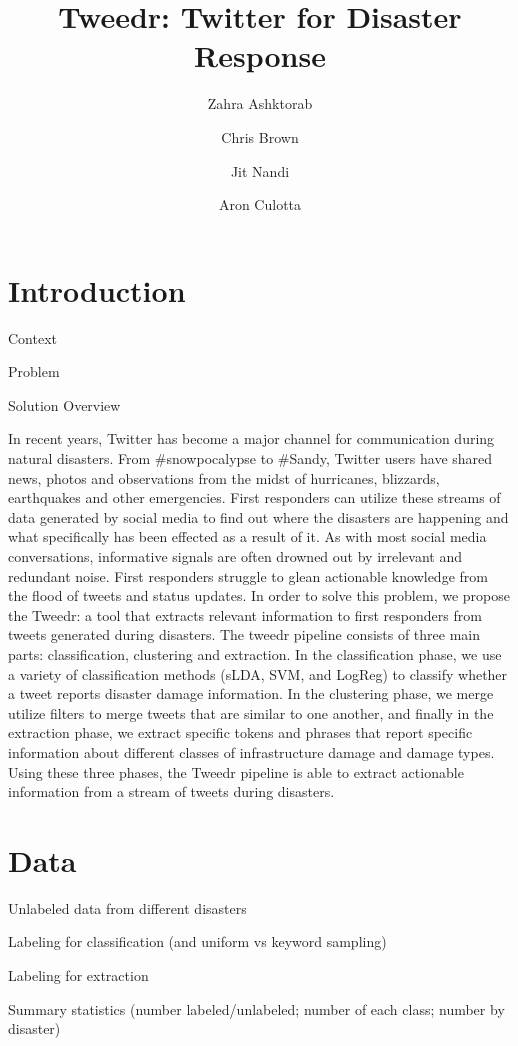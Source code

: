 \documentclass{article}
\title{Tweedr: Twitter for Disaster Response}
\author{Zahra Ashktorab \and Chris Brown \and Jit Nandi \and Aron Culotta}
\begin{document}
\maketitle

\section{Introduction}

\begin{outline}
  \item Context
  \item Problem
  \item Solution Overview
\end{outline}
In recent years, Twitter has become a major channel for communication during natural disasters. From \#snowpocalypse to \#Sandy, Twitter users have shared news, photos and observations from the midst of hurricanes, blizzards, earthquakes and other emergencies. First responders can utilize these streams of data generated by social media to find out where the disasters are happening and what specifically has been effected as a result of it.
As with most social media conversations, informative signals are often drowned out by irrelevant and redundant noise. First responders struggle to glean actionable knowledge from the flood of tweets and status updates.
In order to solve this problem, we propose the Tweedr: a tool that extracts relevant information to first responders from tweets generated during disasters. The tweedr pipeline consists of three main parts: classification, clustering and extraction. In the classification phase, we use a variety of classification methods (sLDA, SVM, and LogReg) to classify whether a tweet reports disaster damage information. In the clustering phase, we merge utilize filters to merge tweets that are similar to one another, and finally in the extraction phase, we extract specific tokens and phrases that report specific information about different classes of infrastructure damage and damage types. Using these three phases, the Tweedr pipeline is able to extract actionable information from a stream of tweets during disasters.

\section{Data}
\begin{outline}
  \item Unlabeled data from different disasters
  \item Labeling for classification (and uniform vs keyword sampling)
  \item Labeling for extraction
  \item Summary statistics (number labeled/unlabeled; number of each class; number by disaster)
\end{outline}
\end{document}
